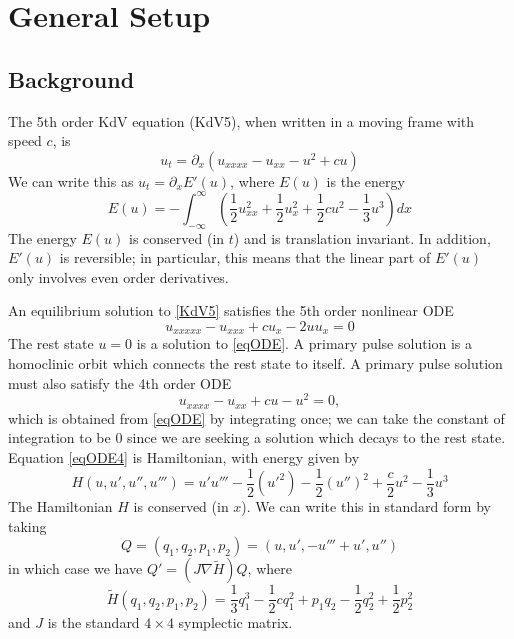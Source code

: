 \documentclass[thesis.tex]{subfiles}
\begin{document}
\chapter{General Setup}

\section{Background}

The 5th order KdV equation (KdV5), when written in a moving frame with speed $c$, is
\begin{equation}\label{KdV5}
u_t = \partial_x(u_{xxxx} - u_{xx} - u^2 + cu) 
\end{equation}
We can write this as $u_t = \partial_x E'(u)$, where $E(u)$ is the energy
\begin{equation}\label{energy}
E(u) = -\int_{-\infty}^{\infty} \left( \frac{1}{2}u_{xx}^2 + \frac{1}{2}u_x^2 + \frac{1}{2}cu^2 - \frac{1}{3}u^3 \right) dx
\end{equation}
The energy $E(u)$ is conserved (in $t$) and is translation invariant. In addition, $E'(u)$ is reversible; in particular, this means that the linear part of $E'(u)$ only involves even order derivatives.

An equilibrium solution to \eqref{KdV5} satisfies the 5th order nonlinear ODE
\begin{equation}\label{eqODE}
u_{xxxxx} - u_{xxx} + c u_x - 2 u u_x = 0
\end{equation}
The rest state $u = 0$ is a solution to \eqref{eqODE}. A primary pulse solution is a homoclinic orbit which connects the rest state to itself. A primary pulse solution must also satisfy the 4th order ODE
\begin{equation}\label{eqODE4}
u_{xxxx} - u_{xx} + c u - u^2 = 0,
\end{equation}
which is obtained from \eqref{eqODE} by integrating once; we can take the constant of integration to be 0 since we are seeking a solution which decays to the rest state. Equation \eqref{eqODE4} is Hamiltonian, with energy given by
\begin{equation}\label{Hamiltonian}
H(u, u', u'', u''') = u'u''' - \frac{1}{2}(u'^2) - \frac{1}{2}(u'')^2 + \frac{c}{2}u^2 - \frac{1}{3}u^3 
\end{equation}
The Hamiltonian $H$ is conserved (in $x$). We can write this in standard form by taking
\[
Q = (q_1, q_2, p_1, p_2) = (u, u', -u''' + u', u'')
\]
in which case we have $Q' = (J \nabla \tilde{H}) Q$, where
\begin{equation}
\tilde{H}(q_1, q_2, p_1, p_2) = \frac{1}{3}q_1^3 - \frac{1}{2}c q_1^2 + p_1 q_2 - \frac{1}{2}q_2^2 + \frac{1}{2}p_2^2
\end{equation}
and $J$ is the standard $4 \times 4$ symplectic matrix.
\end{document}
